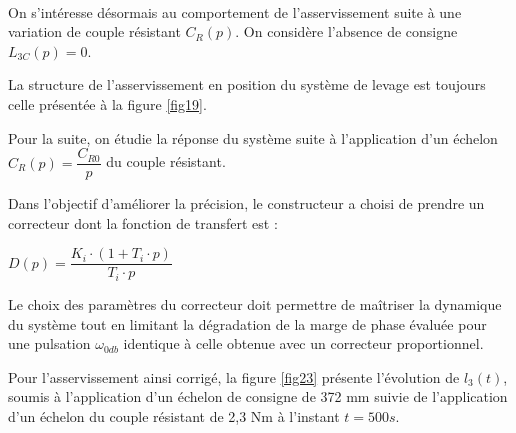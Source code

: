 
~\

On s'intéresse désormais au comportement de l'asservissement suite à une variation de couple résistant $C_R(p)$. On considère l'absence de consigne $L_{3C}(p)=0$.

La structure de l'asservissement en position du système de levage est toujours celle présentée à la figure \ref{fig19}.


Pour la suite, on étudie la réponse du système suite à l'application d'un échelon $C_R(p)=\dfrac{C_{R0}}{p}$ du couple résistant.


Dans l'objectif d'améliorer la précision, le constructeur a choisi de prendre un correcteur dont la fonction de transfert est :

\begin{center}
$D(p)=\dfrac{K_i\cdot (1+T_i\cdot p)}{T_i\cdot p}$
\end{center}

Le choix des paramètres du correcteur doit permettre de maîtriser la dynamique du système tout en limitant la dégradation de la marge de phase évaluée pour une pulsation $\omega_{0db}$ identique à celle obtenue avec un correcteur proportionnel.


\newpage

Pour l'asservissement ainsi corrigé, la figure \ref{fig23} présente l'évolution de $l_3(t)$, soumis à l'application d'un échelon de consigne de 372 mm suivie de l'application d'un échelon du couple résistant de 2,3 Nm à l'instant $t=500s$.

